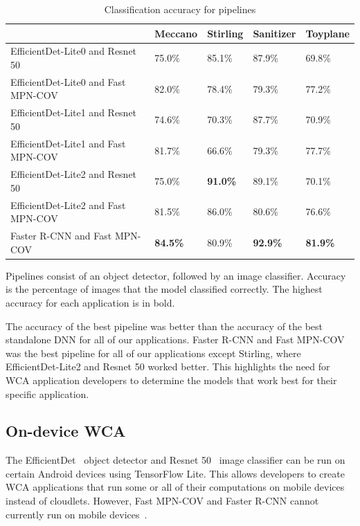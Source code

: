 \begin{table}
\begin{tabular}{|l||l|l|l|l|}
  \hline
  & Meccano & Stirling & Sanitizer & Toyplane\\
  \hline
  \hline
  EfficientDet-Lite0 and Resnet 50 & 75.0\% & 85.1\% & 87.9\% & 69.8\%\\
  EfficientDet-Lite0 and Fast MPN-COV & 82.0\% & 78.4\% & 79.3\% & 77.2\%\\
  EfficientDet-Lite1 and Resnet 50 & 74.6\% & 70.3\% & 87.7\% & 70.9\%\\
  EfficientDet-Lite1 and Fast MPN-COV & 81.7\% & 66.6\% & 79.3\% & 77.7\%\\
  EfficientDet-Lite2 and Resnet 50 & 75.0\% & \textbf{91.0\%} & 89.1\% & 70.1\%\\
  EfficientDet-Lite2 and Fast MPN-COV & 81.5\% & 86.0\% & 80.6\% & 76.6\%\\
  Faster R-CNN and Fast MPN-COV & \textbf{84.5\%} & 80.9\% & \textbf{92.9\%} & \textbf{81.9\%}\\
  \hline
\end{tabular}
  \begin{captiontext}
    Pipelines consist of an object detector, followed by an image classifier.
    Accuracy is the percentage of images that the model classified correctly.
    The highest accuracy for each application is in bold.
  \end{captiontext}
  \caption{
    Classification accuracy for pipelines
  }\label{tab:pipeline_accuracy}
\end{table}

The accuracy of the best pipeline was better than the accuracy of the best
standalone DNN for all of our applications.
Faster R-CNN and Fast MPN-COV was the best pipeline for all of our applications
except Stirling, where EfficientDet-Lite2 and Resnet 50 worked better.
This highlights the need for WCA application developers to determine the models
that work best for their specific application.

\subsection{On-device WCA}\label{sec:on_device}

The EfficientDet~\cite{Tan2020} object detector and Resnet 50~\cite{He2016}
image classifier can be run on certain Android devices using TensorFlow Lite.
This allows developers to create WCA applications that run some or all of their
computations on mobile devices instead of cloudlets.
However, Fast MPN-COV and Faster R-CNN cannot currently run on mobile
devices~\cite{tflite, torchscript}.

